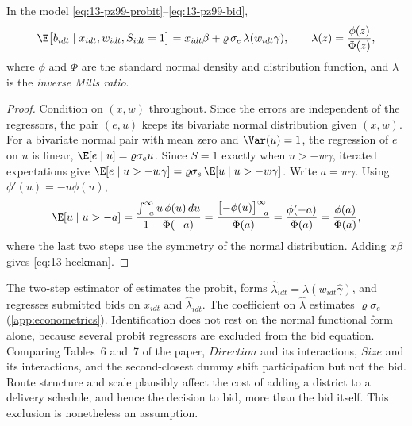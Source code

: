 \begin{lemma}\label{lem:13-heckman}
In the model \eqref{eq:13-pz99-probit}--\eqref{eq:13-pz99-bid},
\begin{equation}\label{eq:13-heckman}
  \E\bigl[b_{idt} \mid x_{idt}, w_{idt}, S_{idt} = 1\bigr] = x_{idt}\beta + \varrho\,\sigma_e\,\lambda(w_{idt}\gamma),
  \qquad \lambda(z) = \frac{\phi(z)}{\Phi(z)} ,
\end{equation}
where $\phi$ and $\Phi$ are the standard normal density and distribution function, and $\lambda$ is the
\emph{inverse Mills ratio}.
\end{lemma}

\begin{proof}
Condition on $(x, w)$ throughout. Since the errors are independent of the regressors, the pair $(e, u)$ keeps its
bivariate normal distribution given $(x, w)$. For a bivariate normal pair with mean zero and $\Var(u) = 1$, the
regression of $e$ on $u$ is linear, $\E[e \mid u] = \varrho\sigma_e u$. Since $S = 1$ exactly when $u > -w\gamma$,
iterated expectations give
$\E[e \mid u > -w\gamma] = \varrho\sigma_e\,\E[u \mid u > -w\gamma]$. Write $a = w\gamma$. Using $\phi'(u) = -u\phi(u)$,
\begin{equation*}
  \E[u \mid u > -a] = \frac{\int_{-a}^{\infty}u\,\phi(u)\,du}{1 - \Phi(-a)}
  = \frac{\bigl[-\phi(u)\bigr]_{-a}^{\infty}}{\Phi(a)} = \frac{\phi(-a)}{\Phi(a)} = \frac{\phi(a)}{\Phi(a)} ,
\end{equation*}
where the last two steps use the symmetry of the normal distribution. Adding $x\beta$ gives \eqref{eq:13-heckman}.
\end{proof}

The two-step estimator of \citet{Heckman1979} estimates the probit, forms $\hat\lambda_{idt} = \lambda(w_{idt}\hat\gamma)$,
and regresses submitted bids on $x_{idt}$ and $\hat\lambda_{idt}$. The coefficient on $\hat\lambda$ estimates
$\varrho\sigma_e$ (\cref{app:econometrics}). Identification does not rest on the normal functional form alone,
because several probit regressors are excluded from the bid equation. Comparing Tables~6 and~7 of the paper,
$\mathit{Direction}$ and its interactions, $\mathit{Size}$ and its interactions, and the second-closest dummy shift
participation but not the bid. Route structure and scale plausibly affect the cost of adding a district to a delivery
schedule, and hence the decision to bid, more than the bid itself. This exclusion is nonetheless an assumption.


